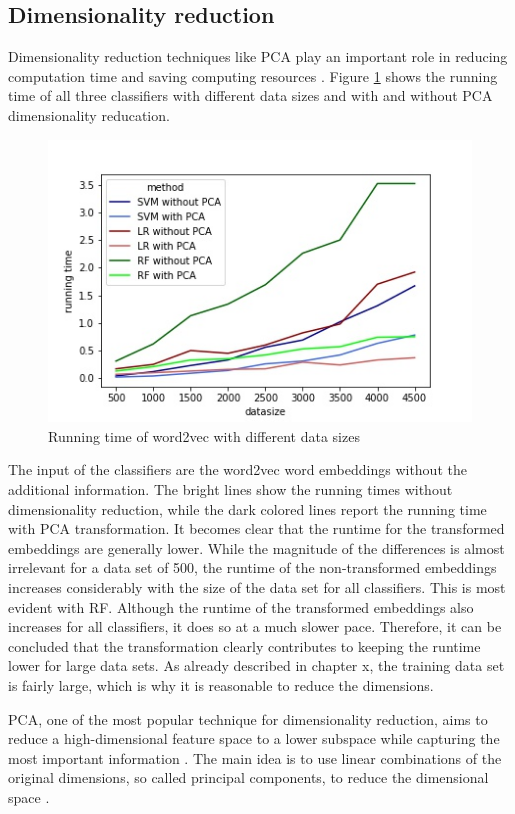\documentclass[12pt, a4paper, titlepage]{article}
\begin{document}
\subsection{Dimensionality reduction}
Dimensionality reduction techniques like \ac{PCA} play an important role in reducing computation time and saving computing resources \citep{ayesha2020}. Figure \ref{fig: F6} shows the running time of all three classifiers with different data sizes and with and without \ac{PCA} dimensionality reducation. 


\begin{figure}[hb!]
  \center
  \includegraphics[scale=0.5]{running_time_PCA.jpeg}
  \caption{\label{fig: F6} Running time of word2vec with different data sizes}
\end{figure}

The input of the classifiers are the word2vec word embeddings without the additional information. The bright lines show the running times without dimensionality reduction, while the dark colored lines report the running time with \ac{PCA} transformation. It becomes clear that the runtime for the transformed embeddings are generally lower. While the magnitude of the differences is almost irrelevant for a data set of 500, the runtime of the non-transformed embeddings increases considerably with the size of the data set for all classifiers. This is most evident with \ac{RF}. Although the runtime of the transformed embeddings also increases for all classifiers, it does so at a much slower pace. Therefore, it can be concluded that the transformation clearly contributes to keeping the runtime lower for large data sets. As already described in chapter x, the training data set is fairly large, which is why it is reasonable to reduce the dimensions. 

\ac{PCA}, one of the most popular technique for dimensionality reduction, aims to reduce a high-dimensional feature space to a lower subspace while capturing the most important information \citep{tipping1999, bisong2019}. The main idea is to use linear combinations of the original dimensions, so called principal components, to reduce the dimensional space \citep{bro2014,geladi2017}. 
\end{document}
